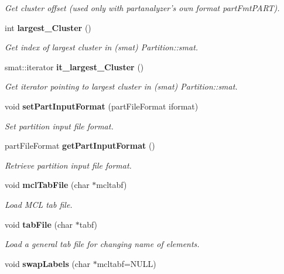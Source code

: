 \begin{CompactItemize}
\begin{CompactList}\small\item\em Get cluster offset (used only with partanalyzer's own format part\-Fmt\-PART). \item\end{CompactList}\item 
int {\bf largest\_\-Cluster} ()\label{classPartition_a19}

\begin{CompactList}\small\item\em Get index of largest cluster in (smat) Partition::smat. \item\end{CompactList}\item 
smat::iterator {\bf it\_\-largest\_\-Cluster} ()\label{classPartition_a20}

\begin{CompactList}\small\item\em Get iterator pointing to largest cluster in (smat) Partition::smat. \item\end{CompactList}\item 
void {\bf set\-Part\-Input\-Format} (part\-File\-Format iformat)\label{classPartition_a21}

\begin{CompactList}\small\item\em Set partition input file format. \item\end{CompactList}\item 
part\-File\-Format {\bf get\-Part\-Input\-Format} ()\label{classPartition_a22}

\begin{CompactList}\small\item\em Retrieve partition input file format. \item\end{CompactList}\item 
void {\bf mcl\-Tab\-File} (char $\ast$mcltabf)\label{classPartition_a23}

\begin{CompactList}\small\item\em Load MCL tab file. \item\end{CompactList}\item 
void {\bf tab\-File} (char $\ast$tabf)\label{classPartition_a24}

\begin{CompactList}\small\item\em Load a general tab file for changing name of elements. \item\end{CompactList}\item 
void {\bf swap\-Labels} (char $\ast$mcltabf=NULL)\label{classPartition_a25}


\end{CompactItemize}
